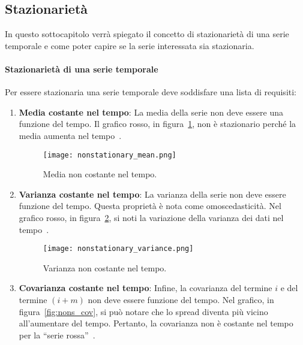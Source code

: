 \subsection{Stazionarietà}
In questo sottocapitolo verrà spiegato il concetto di stazionarietà di una serie
temporale e come poter capire se la serie interessata sia stazionaria.
 
\paragraph{Stazionarietà di una serie temporale} %
Per essere stazionaria una serie temporale deve soddisfare
una lista di requisiti:
\begin{enumerate}
    
    \item \textbf{Media costante nel tempo}: La media della serie non deve essere 
    una funzione del tempo. Il grafico rosso, in figura~\ref*{fig:nons_mean}, non è stazionario 
    perché la media aumenta nel tempo~\cite{sa:stationary}.

    \begin{figure}[H]
        \centering
        \texttt{[image: nonstationary\_mean.png]}
        \caption{Media non costante nel tempo.}
        \label{fig:nons_mean}
    \end{figure}


    \item \textbf{Varianza costante nel tempo}: La varianza della serie non deve 
    essere funzione del tempo. Questa proprietà è nota come omoscedasticità. 
    Nel grafico rosso, in figura~\ref*{fig:nons_var}, 
    si noti la variazione della varianza dei dati nel tempo~\cite{sa:stationary}.

    \begin{figure}[H]
        \centering
        \texttt{[image: nonstationary\_variance.png]}
        \caption{Varianza non costante nel tempo.}
        \label{fig:nons_var}
    \end{figure}

    \item \textbf{Covarianza costante nel tempo}: Infine, la covarianza del 
    termine $i$ e del termine $(i + m)$ non deve essere funzione del tempo. 
    Nel grafico, in figura~\ref*{fig:nons_cov}, si può notare che lo spread 
    diventa più vicino all'aumentare del tempo. Pertanto, 
    la covarianza non è costante nel tempo per la ``serie rossa''~\cite{sa:stationary}.


\end{enumerate}
